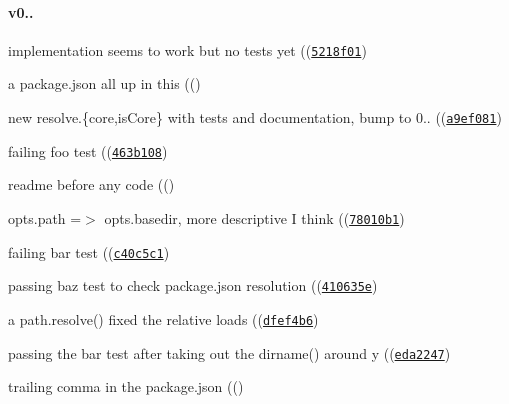 \paragraph*{v0..}


\begin{DoxyItemize}
\item implementation seems to work but no tests yet ((\href{https://github.com/browserify/resolve/commit/5218f0106e78edce4cfb905d0ea4492ed3fd38af}{\tt {\ttfamily 5218f01}})
\item a package.\+json all up in this ((\href{https://github.com/browserify/resolve/commit/40840435a621120db78126c1792df7fdd0570703}{\tt {}})
\item new resolve.\{core,is\+Core\} with tests and documentation, bump to 0.. ((\href{https://github.com/browserify/resolve/commit/a9ef081a4897e9882bf6bc6b31457c53b8d0fc0d}{\tt {\ttfamily a9ef081}})
\item failing foo test ((\href{https://github.com/browserify/resolve/commit/463b108dd6e750196cba150348bd68397522c908}{\tt {\ttfamily 463b108}})
\item readme before any code ((\href{https://github.com/browserify/resolve/commit/7885443d8a3dba7223b1bfca2d62cafc08a46436}{\tt {}})
\item opts.\+path =$>$ opts.\+basedir, more descriptive I think ((\href{https://github.com/browserify/resolve/commit/78010b1f91251447d1e74c6ac9cd0baebc6ddf60}{\tt {\ttfamily 78010b1}})
\item failing bar test ((\href{https://github.com/browserify/resolve/commit/c40c5c14038acbe8bec91cf979d12382c2e6ddfe}{\tt {\ttfamily c40c5c1}})
\item passing baz test to check package.\+json resolution ((\href{https://github.com/browserify/resolve/commit/410635ef6226c030f74c4475e73724a01a102896}{\tt {\ttfamily 410635e}})
\item a path.\+resolve() fixed the relative loads ((\href{https://github.com/browserify/resolve/commit/dfef4b6185d02259c119a10c8a938e1ab148b140}{\tt {\ttfamily dfef4b6}})
\item passing the bar test after taking out the dirname() around y ((\href{https://github.com/browserify/resolve/commit/eda22479bd47c5d0b2e8a88851d9ffabbea2329c}{\tt {\ttfamily eda2247}})
\item trailing comma in the package.\+json ((\href{https://github.com/browserify/resolve/commit/20327532053284676a269ec2441a87f16456fbf3}{\tt {}}) 
\end{DoxyItemize}